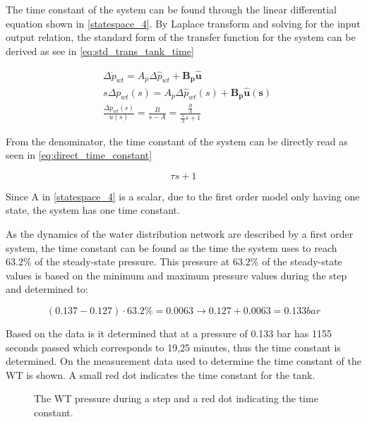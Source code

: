 The time constant of the system can be found through the linear differential equation shown in \eqref{statespace_4}. By Laplace transform and solving for the input output relation, the standard form of the transfer function for the system can be derived as see in \eqref{eq:std_trans_tank_time}

\begin{equation}
	\begin{split}
	&\Delta \dot{p}_{wt} = A_p \Delta \hat{p}_{wt}  + \pmb{B_p}\pmb{\hat{u}}\\
	&s\Delta p_{wt}(s) = A_p \Delta \hat{p}_{wt}(s)  + \pmb{B_p}\pmb{\hat{u}(s)}\\
	&\frac{\Delta p_{wt}(s)}{u(s)} = \frac{B}{s-A} = \frac{\frac{B}{A}}{\frac{1}{A}s + 1}
	\end{split}
	\label{eq:std_trans_tank_time}
\end{equation}

From the denominator, the time constant of the system can be directly read as seen in \eqref{eq:direct_time_constant}

\begin{equation}
	\tau s + 1
	\label{eq:direct_time_constant}
\end{equation}

 Since A in \eqref{statespace_4} is a scalar, due to the first order model only having one state, the system has one time constant. 

As the dynamics of the water distribution network are described by a first order system, the time constant can be found as the time the system uses to reach $63.2\%$ of the steady-state pressure.
This pressure at $63.2\%$ of the steady-state values is based on the minimum and maximum pressure values during the step and determined to:

\begin{equation}
(0.137 - 0.127)\cdot63.2 \% = 0.0063 \rightarrow 0.127 + 0.0063 = 0.133 \unit{bar} 
\end{equation}

Based on the data is it determined that at a pressure of 0.133 bar has 1155 seconds passed which corresponds to 19,25 minutes, thus the time constant is determined. 
On  the measurement data used to determine the time constant of the WT is shown. A small red dot indicates the time constant for the tank.

\begin{figure}[H]

\caption{The WT pressure during a step and a red dot indicating the time constant.}
\label{fig:Test_WT_Timeconstant}
\end{figure}

